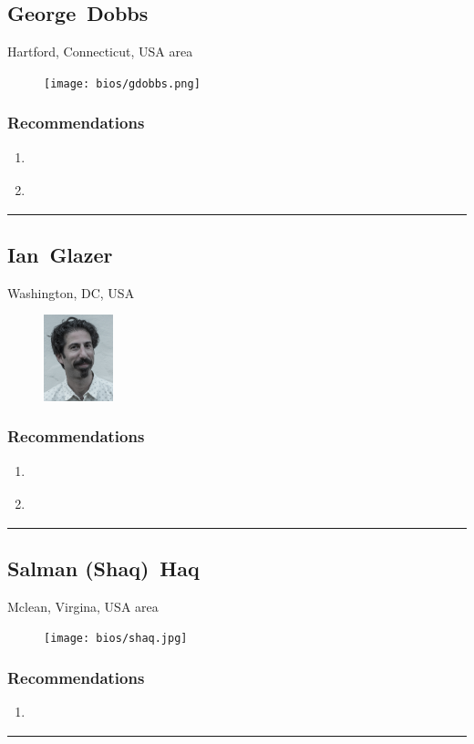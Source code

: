 \subsection{George~Dobbs} \textsf{Hartford, Connecticut, USA area} \par \setlength{\columnsep}{0pt} \begin{figure} \centering \texttt{[image: bios/gdobbs.png]} \end{figure} \textsf{  } \WFclear \subsubsection{Recommendations}\begin{enumerate}
\item \cite{Cameron2005}
\item \cite{Hoffman1977}
\end{enumerate}\noindent\rule{\textwidth}{0.2pt}

\subsection{Ian~Glazer} \textsf{Washington, DC, USA} \par \setlength{\columnsep}{0pt} \begin{figure} \centering \includegraphics[width=0.18\textwidth]{bios/iglazer.jpg} \end{figure} \textsf{  } \WFclear \subsubsection{Recommendations}\begin{enumerate}
\item \cite{Clippinger2007}
\item \cite{Richer2017}
\end{enumerate}\noindent\rule{\textwidth}{0.2pt}

\subsection{Salman (Shaq)~Haq} \textsf{Mclean, Virgina, USA area} \par \setlength{\columnsep}{0pt} \begin{figure} \centering \texttt{[image: bios/shaq.jpg]} \end{figure} \textsf{  } \WFclear \subsubsection{Recommendations}\begin{enumerate}
\item \cite{Windley2005}
\end{enumerate}\noindent\rule{\textwidth}{0.2pt}

